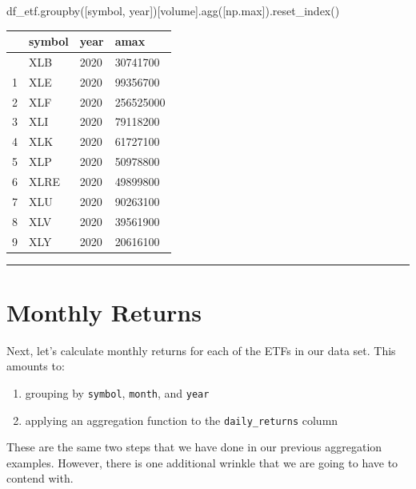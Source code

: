 \documentclass[
  letterpaper,
  DIV=11,
  numbers=noendperiod]{scrreprt}
\newenvironment{Shaded}{\begin{snugshade}}{\end{snugshade}}
\newcommand{\BuiltInTok}[1]{\textcolor[rgb]{0.00,0.23,0.31}{#1}}
\newcommand{\NormalTok}[1]{\textcolor[rgb]{0.00,0.23,0.31}{#1}}
\newcommand{\StringTok}[1]{\textcolor[rgb]{0.13,0.47,0.30}{#1}}
\begin{document}
\begin{Shaded}
\begin{Highlighting}[]
\NormalTok{df\_etf.groupby([}\StringTok{\textquotesingle{}symbol\textquotesingle{}}\NormalTok{, }\StringTok{\textquotesingle{}year\textquotesingle{}}\NormalTok{])[}\StringTok{\textquotesingle{}volume\textquotesingle{}}\NormalTok{].agg([np.}\BuiltInTok{max}\NormalTok{]).reset\_index()}
\end{Highlighting}
\end{Shaded}

\begin{longtable}[]{@{}llll@{}}
\toprule\noalign{}
& symbol & year & amax \\
\midrule\noalign{}
\endhead
\bottomrule\noalign{}
\endlastfoot
0 & XLB & 2020 & 30741700 \\
1 & XLE & 2020 & 99356700 \\
2 & XLF & 2020 & 256525000 \\
3 & XLI & 2020 & 79118200 \\
4 & XLK & 2020 & 61727100 \\
5 & XLP & 2020 & 50978800 \\
6 & XLRE & 2020 & 49899800 \\
7 & XLU & 2020 & 90263100 \\
8 & XLV & 2020 & 39561900 \\
9 & XLY & 2020 & 20616100 \\
\end{longtable}

\begin{center}\rule{0.5\linewidth}{0.5pt}\end{center}

\hypertarget{monthly-returns}{%
\section{Monthly Returns}\label{monthly-returns}}

Next, let's calculate monthly returns for each of the ETFs in our data
set. This amounts to:

\begin{enumerate}
\def\labelenumi{\arabic{enumi}.}
\item
  grouping by \texttt{symbol}, \texttt{month}, and \texttt{year}
\item
  applying an aggregation function to the \texttt{daily\_returns} column
\end{enumerate}

These are the same two steps that we have done in our previous
aggregation examples. However, there is one additional wrinkle that we
are going to have to contend with.
\end{document}
